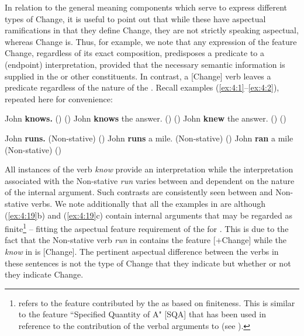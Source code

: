 In relation to the general meaning components which serve to express
different types of Change, it is useful to point out that while these
have aspectual ramifications in that they define Change, they are not
strictly speaking aspectual, whereas Change is.  Thus, for example, we
note that any expression of the feature Change, regardless of its
exact composition, predisposes a predicate to a  (endpoint)
interpretation, provided that the necessary semantic information is
supplied in the  or other constituents.  In contrast,
a [\textminus Change] verb leaves a predicate  regardless of the nature of
the .  Recall examples (\ref{ex:4:1}--\ref{ex:4:2}), repeated here for
convenience:

\ea%
\label{ex:4:19}
\ea John \textbf{knows.} () () \ex John \textbf{knows} the
answer. () () \ex John \textbf{knew} the answer. ()
() \z \z

\ea%
\label{ex:4:20}
\ea John \textbf{runs.} (Non-stative) () 
\ex John \textbf{runs} a mile. (Non-stative) () 
\ex John \textbf{ran} a mile (Non-stative) () 
\z \z

All instances of the verb \textit{know} provide an  interpretation
while the interpretation associated with the Non-stative \textit{run} varies
between  and  dependent on the nature of the internal
argument.  Such contrasts are consistently seen between  and
Non-stative verbs.  We note additionally that all the examples in
 are  although (\ref{ex:4:19}b) and (\ref{ex:4:19}c) contain internal arguments that may be regarded as finite\footnote{\citet{Verkuyl1993} refers to
the feature contributed by the  as based on
finiteness. This is similar to the feature ``Specified Quantity of A"
[SQA] that has been used in reference to the contribution of the
verbal arguments to  (see  \citealt{Tenny1994,MacDonald2008}).} 
-- fitting the aspectual feature requirement of the  for .  This is due to the fact that the Non-stative verb \textit{run} in 
contains the feature [+Change] while the  \textit{know} in
 is [\textminus Change].  The pertinent aspectual difference
between the verbs in these sentences is not the type of Change that
they indicate but whether or not they indicate Change.

